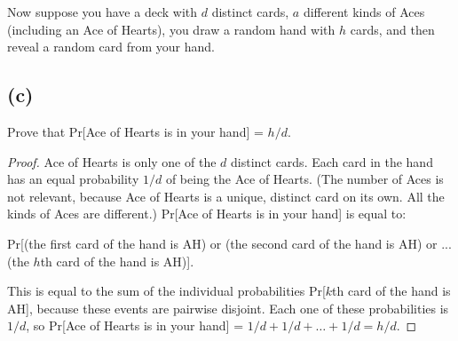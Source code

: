 \documentclass[14pt]{extarticle}
\begin{document}
Now suppose you have a deck with $d$ distinct cards, $a$ different kinds of Aces (including an Ace of Hearts), you draw a random hand with $h$ cards, and then reveal a random card from your hand.

\subsection{(c)}
Prove that Pr[Ace of Hearts is in your hand] = $h/d$.
\begin{proof}
Ace of Hearts is only one of the $d$ distinct cards. Each card in the hand has an equal probability $1/d$ of being the Ace of Hearts. (The number of Aces is not relevant, because Ace of Hearts is a unique, distinct card on its own. All the kinds of Aces are different.) Pr[Ace of Hearts is in your hand] is equal to:

Pr[(the first card of the hand is AH) or (the second card of the hand is AH) or ... (the $h$th card of the hand is AH)].

This is equal to the sum of the individual probabilities Pr[$k$th card of the hand is AH], because these events are pairwise disjoint. Each one of these probabilities is $1/d$, so Pr[Ace of Hearts is in your hand] = $1/d + 1/d + \ldots + 1/d = h/d$.
\end{proof}
\end{document}
